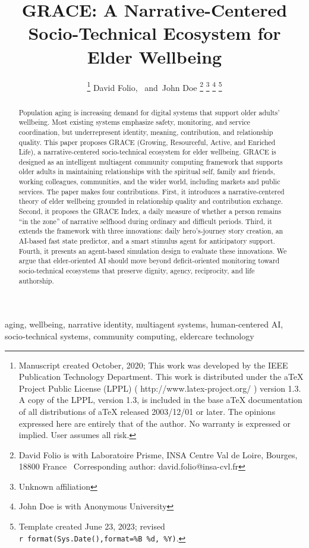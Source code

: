 \documentclass[
  journal,
]{IEEEtran}%
\title{GRACE: A Narrative-Centered Socio-Technical Ecosystem for Elder
Wellbeing}
\author{
\thanks{Manuscript created October, 2020; This work was developed by the
IEEE Publication Technology Department. This work is distributed under
the aTeX Project Public License (LPPL) ( http://www.latex-project.org/
) version 1.3. A copy of the LPPL, version 1.3, is included in the base
aTeX documentation of all distributions of aTeX released 2003/12/01 or
later. The opinions expressed here are entirely that of the author. No
warranty is expressed or implied. User assumes all risk.}
David Folio\orcidlink{0000-0001-9430-6091},~\IEEEmembership{Member,
IEEE}
and~John Doe%
\thanks{David Folio is with Laboratoire Prisme, INSA Centre Val de
Loire, Bourges, 18800 France%
  Corresponding author: david.folio@insa-cvl.fr
}
\thanks{Unknown affiliation}
\thanks{John Doe is with Anonymous University%
}
\thanks{Template created June 23, 2023; revised
\texttt{r\ format(Sys.Date(),format=\textquotesingle{}\%B\ \%d,\ \%Y\textquotesingle{})}.}
}
\begin{document}


\maketitle

\begin{abstract}
Population aging is increasing demand for digital systems that support
older adults' wellbeing. Most existing systems emphasize safety,
monitoring, and service coordination, but underrepresent identity,
meaning, contribution, and relationship quality. This paper proposes
GRACE (Growing, Resourceful, Active, and Enriched Life), a
narrative-centered socio-technical ecosystem for elder wellbeing. GRACE
is designed as an intelligent multiagent community computing framework
that supports older adults in maintaining relationships with the
spiritual self, family and friends, working colleagues, communities, and
the wider world, including markets and public services. The paper makes
four contributions. First, it introduces a narrative-centered theory of
elder wellbeing grounded in relationship quality and contribution
exchange. Second, it proposes the GRACE Index, a daily measure of
whether a person remains ``in the zone'' of narrative selfhood during
ordinary and difficult periods. Third, it extends the framework with
three innovations: daily hero's-journey story creation, an AI-based fast
state predictor, and a smart stimulus agent for anticipatory support.
Fourth, it presents an agent-based simulation design to evaluate these
innovations. We argue that elder-oriented AI should move beyond
deficit-oriented monitoring toward socio-technical ecosystems that
preserve dignity, agency, reciprocity, and life authorship.
\end{abstract}
\begin{IEEEkeywords}
aging, wellbeing, narrative identity, multiagent systems, human-centered
AI, socio-technical systems, community computing, eldercare technology
\end{IEEEkeywords}

%
\end{document}
